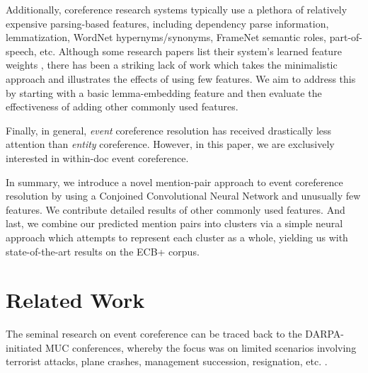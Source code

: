 \documentclass[11pt,a4paper]{article}
\begin{document}
Additionally, coreference research systems typically use a plethora of relatively expensive parsing-based features, including dependency parse information, lemmatization, WordNet hypernyms/synonyms, FrameNet semantic roles, part-of-speech, etc.  Although some research papers list their system's learned feature weights \cite{journals/tacl/YangCF15}, there has been a striking lack of work which takes the minimalistic approach and illustrates the effects of using few features.  We aim to address this by starting with a basic lemma-embedding feature and then evaluate the effectiveness of adding other commonly used features.

Finally, in general, \textit{event} coreference resolution has received drastically less attention than \textit{entity} coreference.  However, in this paper, we are exclusively interested in within-doc event coreference.

In summary, we introduce a novel mention-pair approach to event coreference resolution by using a Conjoined Convolutional Neural Network and unusually few features.  We contribute detailed results of other commonly used features.  And last, we combine our predicted mention pairs into clusters via a simple neural approach which attempts to represent each cluster as a whole, yielding us with state-of-the-art results on the ECB+ corpus.



\section{Related Work}
The seminal research on event coreference can be traced back to the DARPA-initiated MUC conferences, whereby the focus was on limited scenarios involving terrorist attacks, plane crashes, management succession, resignation, etc. \cite{Humphreys:1997,Bagga:1999:CEC:1608810.1608812}.


\end{document}
